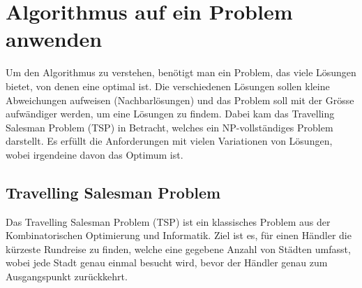 %
%
%
%
\section{Algorithmus auf ein Problem anwenden
\label{buch:paper:varalg:section:find_problem}}
Um den Algorithmus zu verstehen, benötigt man ein Problem, das 
viele Lösungen bietet, von denen eine optimal ist. Die verschiedenen 
Lösungen sollen kleine Abweichungen aufweisen (Nachbarlösungen) 
und das Problem soll mit der Grösse aufwändiger werden, um eine 
Lösungen zu findem. Dabei kam das Travelling Salesman Problem (TSP) 
in Betracht, welches ein NP-vollständiges Problem darstellt. Es 
erfüllt die Anforderungen mit vielen Variationen von Lösungen, wobei
irgendeine davon das Optimum ist.

\subsection{Travelling Salesman Problem
\label{buch:paper:varalg:subsection:tsp}}
Das Travelling Salesman Problem (TSP) ist ein klassisches Problem 
aus der Kombinatorischen Optimierung und Informatik. Ziel ist es, 
für einen Händler die kürzeste Rundreise zu finden, welche eine 
gegebene Anzahl von Städten umfasst, wobei jede Stadt 
genau einmal besucht wird, bevor der Händler genau zum Ausgangspunkt 
zurückkehrt. 

